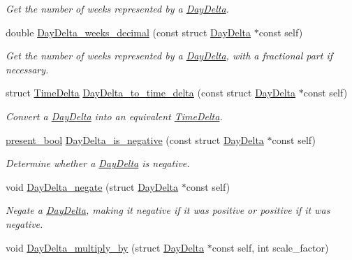 \begin{DoxyCompactItemize}
\begin{DoxyCompactList}\small\item\em \-Get the number of weeks represented by a \hyperlink{structDayDelta}{\-Day\-Delta}. \end{DoxyCompactList}\item 
double \hyperlink{day-delta_8h_af6698416f241e2d9a6f54459fd0282ef}{\-Day\-Delta\-\_\-weeks\-\_\-decimal} (const struct \hyperlink{structDayDelta}{\-Day\-Delta} $\ast$const self)
\begin{DoxyCompactList}\small\item\em \-Get the number of weeks represented by a \hyperlink{structDayDelta}{\-Day\-Delta}, with a fractional part if necessary. \end{DoxyCompactList}\item 
struct \hyperlink{structTimeDelta}{\-Time\-Delta} \hyperlink{day-delta_8h_a4a0892235c656a20f00707d9e0074665}{\-Day\-Delta\-\_\-to\-\_\-time\-\_\-delta} (const struct \hyperlink{structDayDelta}{\-Day\-Delta} $\ast$const self)
\begin{DoxyCompactList}\small\item\em \-Convert a \hyperlink{structDayDelta}{\-Day\-Delta} into an equivalent \hyperlink{structTimeDelta}{\-Time\-Delta}. \end{DoxyCompactList}\item 
\hyperlink{types_8h_a1c24e2cdd988b886e889080ded176ae0}{present\-\_\-bool} \hyperlink{day-delta_8h_ab4347a4d40f2e9577ce86f3fb5fb004d}{\-Day\-Delta\-\_\-is\-\_\-negative} (const struct \hyperlink{structDayDelta}{\-Day\-Delta} $\ast$const self)
\begin{DoxyCompactList}\small\item\em \-Determine whether a \hyperlink{structDayDelta}{\-Day\-Delta} is negative. \end{DoxyCompactList}\item 
void \hyperlink{day-delta_8h_a9deb74bc8d748a21449a16e658f16432}{\-Day\-Delta\-\_\-negate} (struct \hyperlink{structDayDelta}{\-Day\-Delta} $\ast$const self)
\begin{DoxyCompactList}\small\item\em \-Negate a \hyperlink{structDayDelta}{\-Day\-Delta}, making it negative if it was positive or positive if it was negative. \end{DoxyCompactList}\item 
void \hyperlink{day-delta_8h_af8c4a730c36c38da48ba2d6df982c167}{\-Day\-Delta\-\_\-multiply\-\_\-by} (struct \hyperlink{structDayDelta}{\-Day\-Delta} $\ast$const self, int scale\-\_\-factor)

\end{DoxyCompactItemize}
